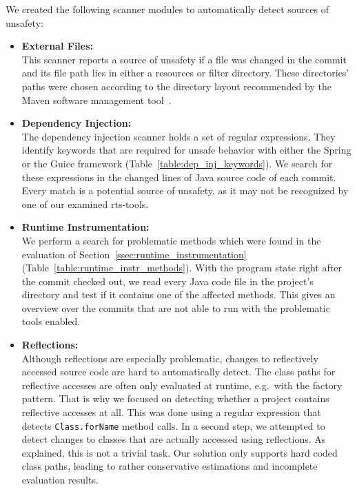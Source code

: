 We created the following scanner modules to automatically detect sources of unsafety:

\begin{itemize}
    \setlength\itemsep{1em}
    \item \textbf{External Files:}\\This scanner reports a source of unsafety if a file was
          changed in the commit and its file path lies in either a resources or filter directory. These
          directories' paths were chosen according to
          the directory layout recommended by the Maven software management tool~\cite{maven_directory_layout}.

    \item \textbf{Dependency Injection:}\\The dependency injection scanner holds a set of regular
          expressions.
          They identify keywords that are required for unsafe behavior with either the Spring or the Guice
          framework (Table~\ref{table:dep_inj_keywords}). We search for these expressions in the changed lines
          of Java source code of each commit. Every match is a potential source of unsafety, as it may not be
          recognized by one of our examined \ac{rts}-tools.

    \item \textbf{Runtime Instrumentation:}\\We perform a search for problematic methods which were found in the evaluation of
          Section~\ref{ssec:runtime_instrumentation} (Table~\ref{table:runtime_instr_methods}).
          With the program state right after the commit checked
          out, we read every Java code file in the project's directory and test if it contains one of the affected
          methods. This gives an overview over the commits that are not able to run with the problematic tools
          enabled.

    \item \textbf{Reflections:}\label{scanner:reflections}
          \\Although reflections are especially problematic, changes to reflectively accessed source code are
          hard to automatically detect. The class paths
          for reflective accesses are often only evaluated at runtime, e.g.~with the factory pattern. That is
          why we focused on detecting whether a project contains reflective accesses at all. This was done
          using a regular expression that detects \texttt{Class.forName} method calls. In a second step, we
          attempted to detect changes to classes that are actually accessed using reflections. As explained, this
          is not a trivial task. Our solution only supports hard coded class paths, leading to rather
          conservative estimations and incomplete evaluation results.
\end{itemize}
